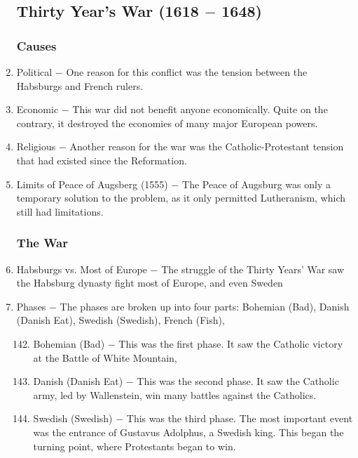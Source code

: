 \documentclass[12pt]{article}
\begin{document}
\begin{enumerate}
\subsection{Thirty Year's War (1618 $-$ 1648)}

\subsubsection{Causes}

\item Political $-$ One reason for this conflict was the tension between the Habsburgs and French rulers.

\item Economic $-$ This war did not benefit anyone economically. Quite on the contrary, it destroyed the economies of many major European powers.

\item Religious $-$ Another reason for the war was the Catholic-Protestant tension that had existed since the Reformation.

\item Limits of Peace of Augsberg (1555) $-$ The Peace of Augsburg was only a temporary solution to the problem, as it only permitted Lutheranism, which still had limitations.

\subsubsection{The War}

\item Habsburgs vs. Most of Europe $-$ The struggle of the Thirty Years' War saw the Habsburg dynasty fight most of Europe, and even Sweden

\item Phases $-$ The phases are broken up into four parts: Bohemian (Bad), Danish (Danish Eat), Swedish (Swedish), French (Fish),

\begin{enumerate}[label=\arabic{*}.]
\setcounter{enumii}{141}

\item Bohemian (Bad) $-$ This was the first phase. It saw the Catholic victory at the Battle of White Mountain,

\item Danish (Danish Eat) $-$ This was the second phase. It saw the Catholic army, led by Wallenstein, win many battles against the Catholics.

\item Swedish (Swedish) $-$ This was the third phase. The most important event was the entrance of Gustavus Adolphus, a Swedish king. This began the turning point, where Protestants began to win.


\end{enumerate}
\end{enumerate}
\end{document}
